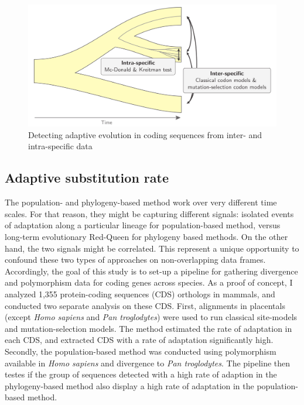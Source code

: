 \begin{figure}[thbp]
	\begin{center}
		\includegraphics[width=\textwidth] {figures/inter-intra}
	\end{center}
	\caption{Detecting adaptive evolution in coding sequences from inter- and intra-specific data}
\end{figure}

\subsection{Adaptive substitution rate}
The population- and phylogeny-based method work over very different time scales.
For that reason, they might be capturing different signals: isolated events of adaptation along a particular lineage for population-based method, versus long-term evolutionary Red-Queen for phylogeny based methods. On the other hand, the two signals might be correlated. This represent a unique opportunity to confound these two types of approaches on non-overlapping data frames. Accordingly, the goal of this study is to set-up a pipeline for gathering divergence and polymorphism data for coding genes across species. As a proof of concept, I analyzed 1,355 protein-coding sequences (CDS) orthologs in mammals, and conducted two separate analysis on these CDS. First, alignments in placentals (except \textit{Homo sapiens} and \textit{Pan troglodytes}) were used to run classical site-models and mutation-selection models. The method estimated the rate of adaptation in each CDS, and extracted CDS with a rate of adaptation significantly high. Secondly, the population-based method was conducted using polymorphism available in \textit{Homo sapiens} and divergence to \textit{Pan troglodytes}. The pipeline then testes if the group of sequences detected with a high rate of adaption in the phylogeny-based method also display a high rate of adaptation in the population-based method.

